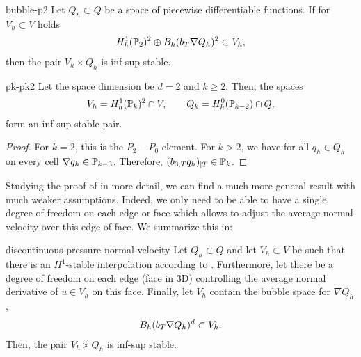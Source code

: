 \begin{Corollary}{bubble-p2}
  Let $Q_h\subset Q$ be a space of piecewise differentiable
  functions. If for $V_h\subset V$ holds
  \begin{gather*}
    H^1_h(\P_2)^2 \oplus B_h(b_\cell \nabla Q_h)^2 \subset V_h,
  \end{gather*}
  then the pair $V_h\times Q_h$ is inf-sup stable.
\end{Corollary}

\begin{Corollary}{pk-pk2}
  Let the space dimension be $d=2$ and $k\ge 2$. Then, the spaces
  \begin{gather}
    V_h = H^1_h(\P_k)^2 \cap V,
    \qquad
    Q_k = H^0_h(\P_{k-2}) \cap Q,
  \end{gather}
  form an inf-sup stable pair.
\end{Corollary}

\begin{proof}
  For $k=2$, this is the $P_2-P_0$ element. For $k>2$, we have for all
  $q_h\in Q_h$ on every cell $\nabla q_h\in \P_{k-3}$. Therefore,
  $(b_{3,\cell} q_h)_{|\cell} \in \P_k$.
\end{proof}

\begin{intro}
  Studying the proof of  in more
  detail, we can find a much more general result with much weaker
  assumptions. Indeed, we only need to be able to have a single degree
  of freedom on each edge or face which allows to adjust the average
  normal velocity over this edge of face. We summarize this in:
\end{intro}

\begin{Theorem}{discontinuous-pressure-normal-velocity}
  Let $Q_h\subset Q$ and let $V_h \subset V$ be such that there is an
  $H^1$-stable interpolation according to
  . Furthermore, let
  there be a degree of freedom on each edge (face in 3D) controlling
  the average normal derivative of $u\in V_h$ on this face. Finally,
  let $V_h$ contain the bubble space for $\nabla Q_h$,
  \begin{gather*}
    B_h(b_\cell \nabla Q_h)^d \subset V_h.    
  \end{gather*}
  Then, the pair $V_h\times Q_h$ is inf-sup stable.
\end{Theorem}

